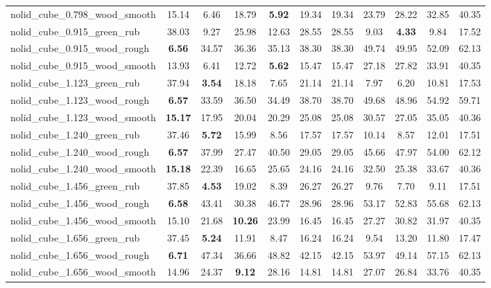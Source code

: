 \begin{table}[H]
{\begin{tabular}{l cccccccccc}
        nolid\_cube\_0.798\_wood\_smooth & 15.14 & 6.46 & 18.79 & \textbf{5.92} & 19.34 & 19.34 & 23.79 & 28.22 & 32.85 & 40.35 \\
        nolid\_cube\_0.915\_green\_rub & 38.03 & 9.27 & 25.98 & 12.63 & 28.55 & 28.55 & 9.03 & \textbf{4.33} & 9.84 & 17.52 \\
        nolid\_cube\_0.915\_wood\_rough & \textbf{6.56} & 34.57 & 36.36 & 35.13 & 38.30 & 38.30 & 49.74 & 49.95 & 52.09 & 62.13 \\
        nolid\_cube\_0.915\_wood\_smooth & 13.93 & 6.41 & 12.72 & \textbf{5.62} & 15.47 & 15.47 & 27.18 & 27.82 & 33.91 & 40.35 \\
        nolid\_cube\_1.123\_green\_rub & 37.94 & \textbf{3.54} & 18.18 & 7.65 & 21.14 & 21.14 & 7.97 & 6.20 & 10.81 & 17.53 \\
        nolid\_cube\_1.123\_wood\_rough & \textbf{6.57} & 33.59 & 36.50 & 34.49 & 38.70 & 38.70 & 49.68 & 48.96 & 54.92 & 59.71 \\
        nolid\_cube\_1.123\_wood\_smooth & \textbf{15.17} & 17.95 & 20.04 & 20.29 & 25.08 & 25.08 & 30.57 & 27.05 & 35.05 & 40.36 \\
        nolid\_cube\_1.240\_green\_rub & 37.46 & \textbf{5.72} & 15.99 & 8.56 & 17.57 & 17.57 & 10.14 & 8.57 & 12.01 & 17.51 \\
        nolid\_cube\_1.240\_wood\_rough & \textbf{6.57} & 37.99 & 27.47 & 40.50 & 29.05 & 29.05 & 45.66 & 47.97 & 54.00 & 62.12 \\
        nolid\_cube\_1.240\_wood\_smooth & \textbf{15.18} & 22.39 & 16.65 & 25.65 & 24.16 & 24.16 & 32.50 & 25.38 & 33.67 & 40.36 \\
        nolid\_cube\_1.456\_green\_rub & 37.85 & \textbf{4.53} & 19.02 & 8.39 & 26.27 & 26.27 & 9.76 & 7.70 & 9.11 & 17.51 \\
        nolid\_cube\_1.456\_wood\_rough & \textbf{6.58} & 43.41 & 30.38 & 46.77 & 28.96 & 28.96 & 53.17 & 52.83 & 55.68 & 62.13 \\
        nolid\_cube\_1.456\_wood\_smooth & 15.10 & 21.68 & \textbf{10.26} & 23.99 & 16.45 & 16.45 & 27.27 & 30.82 & 31.97 & 40.35 \\
        nolid\_cube\_1.656\_green\_rub & 37.45 & \textbf{5.24} & 11.91 & 8.47 & 16.24 & 16.24 & 9.54 & 13.20 & 11.80 & 17.47 \\
        nolid\_cube\_1.656\_wood\_rough & \textbf{6.71} & 47.34 & 36.66 & 48.82 & 42.15 & 42.15 & 53.97 & 49.14 & 57.15 & 62.13 \\
        nolid\_cube\_1.656\_wood\_smooth & 14.96 & 24.37 & \textbf{9.12} & 28.16 & 14.81 & 14.81 & 27.07 & 26.84 & 33.76 & 40.35 \\

\end{tabular}}
\end{table}
